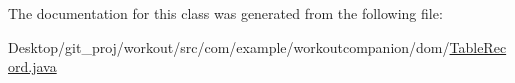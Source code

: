 The documentation for this class was generated from the following file\-:\begin{DoxyCompactItemize}
\item 
Desktop/git\-\_\-proj/workout/src/com/example/workoutcompanion/dom/\hyperlink{_table_record_8java}{Table\-Record.\-java}\end{DoxyCompactItemize}
